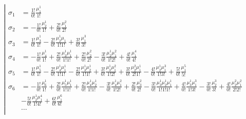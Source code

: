 \begin{equation*} \left| \begin{aligned}
\sigma_1 &= 
  \frac{1!}{0!} \frac{\mu_1^1}{1!}
\\ 
\sigma_2 &= 
- \frac{1!}{0!} \frac{\mu_2^1}{1!} 
+ \frac{2!}{0!} \frac{\mu_1^2}{2!}
\\
\sigma_3 &= 
  \frac{1!}{0!} \frac{\mu_3^1}{1!} 
- \frac{2!}{0!} \frac{\mu_2^1 \mu_1}{1!1!} 
+ \frac{3!}{0!} \frac{\mu_1^3}{3!}
\\
\sigma_4 &= 
- \frac{1!}{0!} \frac{\mu_4^1}{1!} 
+ \frac{2!}{0!} \frac{\mu_3^1 \mu_1^1}{1!1!} 
+ \frac{2!}{0!} \frac{\mu_2^2}{2!}
- \frac{3!}{0!} \frac{\mu_2^1 \mu_1^2}{1!2!}
+ \frac{4!}{0!} \frac{\mu_1^4}{4!}
\\
\sigma_5 &=
  \frac{1!}{0!} \frac{\mu_5^1}{1!} 
- \frac{2!}{0!} \frac{\mu_4^1 \mu_1^1}{1!1!} 
- \frac{2!}{0!} \frac{\mu_3^1 \mu_2^1}{1!1!}
+ \frac{3!}{0!} \frac{\mu_3^1 \mu_1^2}{1!2!}
+ \frac{3!}{0!} \frac{\mu_2^2 \mu_1^1}{2!1!}
- \frac{4!}{0!} \frac{\mu_2^1 \mu_1^3}{1!3!}
+ \frac{5!}{0!} \frac{\mu_1^5}{5!}
\\
\sigma_6 &=
- \frac{1!}{0!} \frac{\mu_6^1}{1!} 
+ \frac{2!}{0!} \frac{\mu_5^1 \mu_1^1}{1!1!} 
+ \frac{2!}{0!} \frac{\mu_4^1 \mu_2^1}{1!1!}
- \frac{3!}{0!} \frac{\mu_4^1 \mu_1^2}{1!2!}
+ \frac{2!}{0!} \frac{\mu_3^2}{2!}
- \frac{3!}{0!} \frac{\mu_3^1 \mu_2^1 \mu_1^1}{1!1!1!}
+ \frac{4!}{0!} \frac{\mu_3^1 \mu_1^3}{1!3!}
- \frac{3!}{0!} \frac{\mu_2^3}{3!}
+ \frac{4!}{0!} \frac{\mu_2^2 \mu_1^2}{2!2!} \\
&
- \frac{5!}{0!} \frac{\mu_2^1 \mu_1^4}{1!4!}
+ \frac{6!}{0!} \frac{\mu_1^6}{6!}
\\
&\ldots
\\
\end{aligned} \right. \end{equation*}

